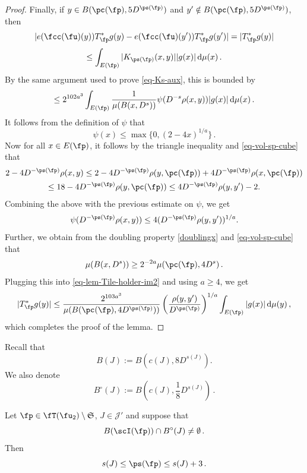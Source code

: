 \begin{proof}
        Finally, if $y \in B(\pc(\fp), 5D^{\ps(\fp)})$ and $y' \notin B(\pc(\fp), 5D^{\ps(\fp)})$, then
        $$
            |e(\fcc(\fu)(y)) T_{\fp}^* g(y) - e(\fcc(\fu)(y')) T_{\fp}^* g(y')| = |T_{\fp}^* g(y)|
        $$
        $$
            \le \int_{E(\fp)} |K_{\ps(\fp)}(x,y)| |g(x)| \, \mathrm{d}\mu(x)\,.
        $$
        By the same argument used to prove \eqref{eq-Ks-aux}, this is bounded by
      \begin{equation}
            \label{eq-lem-Tile-holder-im2}
            \le 2^{102a^3} \int_{E(\fp)} \frac{1}{\mu(B(x, D^s))} \psi(D^{-s} \rho(x,y)) |g(x)| \, \mathrm{d}\mu(x)\,.
        \end{equation}
        It follows from the definition of $\psi$ that
        $$
            \psi(x) \le \max\{0, (2 - 4x)^{1/a}\}\,.
        $$
        Now for all $x\in E(\fp)$, it follows by the triangle inequality and \eqref{eq-vol-sp-cube} that
        \begin{multline*}
        2 - 4D^{-\ps(\fp)}\rho(x,y)\leq 2 - 4D^{-\ps(\fp)}\rho(y, \pc(\fp)) + 4 D^{-\ps(\fp)}\rho(x, \pc(\fp))\\\leq 18 - 4 D^{-\ps(\fp)} \rho(y, \pc(\fp)) \leq 4 D^{-\ps(\fp)}\rho(y,y') - 2 .
        \end{multline*}
        Combining the above with the previous estimate on $\psi$, we get
        $$
            \psi(D^{-\ps(\fp)}\rho(x,y)) \le 4 (D^{-\ps(\fp)}\rho(y,y'))^{1/a}.
        $$
        Further, we obtain from the doubling property \eqref{doublingx} and \eqref{eq-vol-sp-cube} that
        $$
            \mu(B(x, D^s)) \ge 2^{-2a} \mu(\pc(\fp), 4D^s)\,.
        $$
        Plugging this into \eqref{eq-lem-Tile-holder-im2} and using $a \ge 4$, we get
        $$
            |T_{\fp}^* g(y)| \le \frac{2^{103a^3}}{\mu(B(\pc(\fp), 4D^{\ps(\fp)}))} \left(\frac{\rho(y,y')}{D^{\ps(\fp)}}\right)^{1/a} \int_{E(\fp)} |g(x)| \, \mathrm{d}\mu(y)\,,
        $$
        which completes the proof of the lemma.
    \end{proof}

    Recall that
    \begin{equation*}
        B(J) := B(c(J), 8D^{s(J)}).
    \end{equation*}
    We also denote
    \begin{equation*}
     B^\circ{}(J) := B(c(J), \frac{1}{8}D^{s(J)})\, .
    \end{equation*}


    \begin{lemma}
        \label{limited-scale-impact}
        \leanok
        Let $\fp \in \fT(\fu_2) \setminus \mathfrak{S}$, $J \in \mathcal{J}'$ and suppose that
        $$
           B(\scI(\fp)) \cap B^\circ(J) \ne \emptyset\,.
        $$
        Then
        $$
            s(J) \le \ps(\fp) \le s(J) +3\,.
        $$
    \end{lemma}

